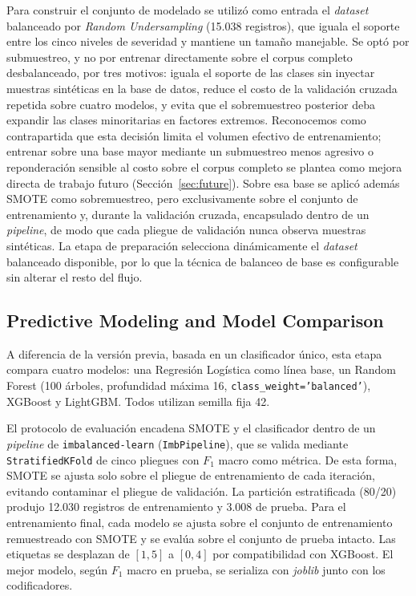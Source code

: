\documentclass[12pt,a4paper]{article}
\begin{document}
Para construir el conjunto de modelado se utilizó como entrada el \textit{dataset} balanceado por \textit{Random Undersampling} (15.038 registros), que iguala el soporte entre los cinco niveles de severidad y mantiene un tamaño manejable. Se optó por submuestreo, y no por entrenar directamente sobre el corpus completo desbalanceado, por tres motivos: iguala el soporte de las clases sin inyectar muestras sintéticas en la base de datos, reduce el costo de la validación cruzada repetida sobre cuatro modelos, y evita que el sobremuestreo posterior deba expandir las clases minoritarias en factores extremos. Reconocemos como contrapartida que esta decisión limita el volumen efectivo de entrenamiento; entrenar sobre una base mayor mediante un submuestreo menos agresivo o reponderación sensible al costo sobre el corpus completo se plantea como mejora directa de trabajo futuro (Sección~\ref{sec:future}). Sobre esa base se aplicó además SMOTE como sobremuestreo, pero exclusivamente sobre el conjunto de entrenamiento y, durante la validación cruzada, encapsulado dentro de un \textit{pipeline}, de modo que cada pliegue de validación nunca observa muestras sintéticas. La etapa de preparación selecciona dinámicamente el \textit{dataset} balanceado disponible, por lo que la técnica de balanceo de base es configurable sin alterar el resto del flujo.

\subsection{Predictive Modeling and Model Comparison}
A diferencia de la versión previa, basada en un clasificador único, esta etapa compara cuatro modelos: una Regresión Logística como línea base, un Random Forest (100 árboles, profundidad máxima 16, \texttt{class\_weight='balanced'}), XGBoost y LightGBM. Todos utilizan semilla fija 42.

El protocolo de evaluación encadena SMOTE y el clasificador dentro de un \textit{pipeline} de \texttt{imbalanced-learn} (\texttt{ImbPipeline}), que se valida mediante \texttt{StratifiedKFold} de cinco pliegues con \(F_1\) macro como métrica. De esta forma, SMOTE se ajusta solo sobre el pliegue de entrenamiento de cada iteración, evitando contaminar el pliegue de validación. La partición estratificada (80/20) produjo 12.030 registros de entrenamiento y 3.008 de prueba. Para el entrenamiento final, cada modelo se ajusta sobre el conjunto de entrenamiento remuestreado con SMOTE y se evalúa sobre el conjunto de prueba intacto. Las etiquetas se desplazan de \([1,5]\) a \([0,4]\) por compatibilidad con XGBoost. El mejor modelo, según \(F_1\) macro en prueba, se serializa con \textit{joblib} junto con los codificadores.
\end{document}
